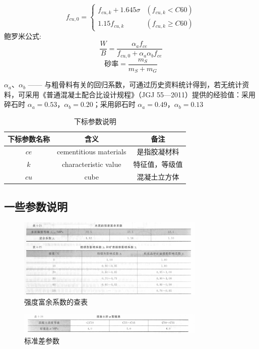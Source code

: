 \documentclass[12pt, a4paper, oneside, UTF8]{ctexbook}
\begin{document}
\begin{remark}
	\[ f_{cu,0} = \left\{ \begin{array}{ll}
f_{cu,k} + 1.645\sigma & (f_{cu,k} < C60) \\
1.15f_{cu,k} & (f_{cu,k} \geq C60)
\end{array} \right. \]
鲍罗米公式:
$$\frac{W}{B} = \frac{\alpha_a f_{ce}}{f_{cu,0} + \alpha_a \alpha_b f_{ce}}$$
$$\text{砂率}=\frac{m_S}{m_S + m_G}$$

$\alpha_a$、$\alpha_b$ —— 与粗骨料有关的回归系数，可通过历史资料统计得到，若无统计资料，可采用《普通混凝土配合比设计规程》（JGJ 55—2011）提供的经验值：采用碎石时 $\alpha_a = 0.53$，$\alpha_b = 0.20$；采用卵石时 $\alpha_a = 0.49$，$\alpha_b = 0.13$
\end{remark}

\begin{table}[H]
	\centering
	\renewcommand{\arraystretch}{1.5}
	\setlength{\tabcolsep}{30pt}
	\begin{tabular}{|c|c|c|}
		\hline
		下标参数名称 & 含义 & 备注 \\
		\hline
		$ce$ & cementitious materials & 是指胶凝材料 \\
		\hline
		$k$ & characteristic value &  特征值，等级值\\
		\hline
		$cu$ & cube  &	混凝土立方体 \\
		\hline
	\end{tabular}
	\caption{下标参数说明}
\end{table}

\subsection{一些参数说明}

\begin{figure}[H]
	\centering
	\includegraphics[width=0.8\textwidth]{../figure/5.png}
	\caption{强度富余系数的查表}
	\label{fig:strength_coefficient}
\end{figure}

\begin{figure}[H]
	\centering
	\includegraphics[width=0.8\textwidth]{../figure/2.png}
	\caption{标准差参数}
	\label{fig:standard_deviation}
\end{figure}
\end{document}

